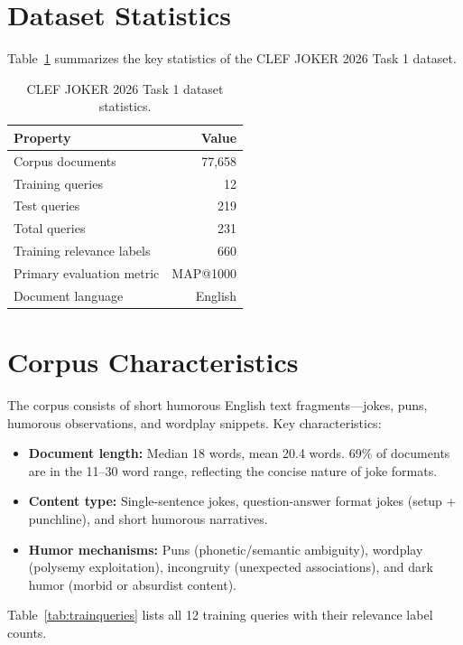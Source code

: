 \section{Dataset Statistics}

Table~\ref{tab:dataset} summarizes the key statistics of the CLEF JOKER 2026 Task 1 dataset.

\begin{table}[H]
\centering
\begin{tabular}{|l|r|}
\hline
\textbf{Property} & \textbf{Value} \\\hline
Corpus documents & 77,658 \\\hline
Training queries & 12 \\\hline
Test queries & 219 \\\hline
Total queries & 231 \\\hline
Training relevance labels & 660 \\\hline
Primary evaluation metric & MAP@1000 \\\hline
Document language & English \\\hline
\end{tabular}
\caption{CLEF JOKER 2026 Task 1 dataset statistics.}
\label{tab:dataset}
\end{table}

\section{Corpus Characteristics}

The corpus consists of short humorous English text fragments---jokes, puns, humorous observations, and wordplay snippets. Key characteristics:

\begin{itemize}
    \item \textbf{Document length:} Median 18 words, mean 20.4 words. 69\% of documents are in the 11--30 word range, reflecting the concise nature of joke formats.
    \item \textbf{Content type:} Single-sentence jokes, question-answer format jokes (setup + punchline), and short humorous narratives.
    \item \textbf{Humor mechanisms:} Puns (phonetic/semantic ambiguity), wordplay (polysemy exploitation), incongruity (unexpected associations), and dark humor (morbid or absurdist content).
\end{itemize}

Table~\ref{tab:trainqueries} lists all 12 training queries with their relevance label counts.

